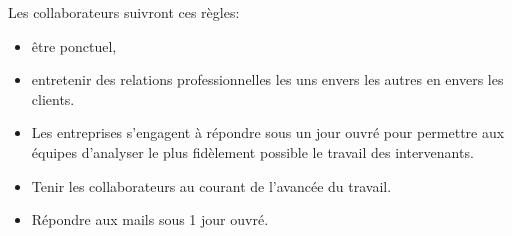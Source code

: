 \documentclass[twoside]{article}
\begin{document}
Les collaborateurs suivront ces règles:
\begin{itemize}
\item être ponctuel,
\item entretenir des relations professionnelles les uns envers les
        autres en envers les clients.
\item Les entreprises s'engagent à répondre sous un jour ouvré pour 
        permettre aux équipes d'analyser le plus fidèlement possible
        le travail des intervenants.
\item Tenir les collaborateurs au courant de l'avancée du travail.
\item Répondre aux mails sous 1 jour ouvré.
\end{itemize}


\end{document}
